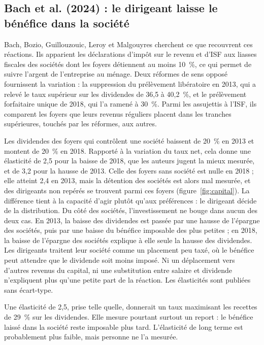 \documentclass[11pt,a4paper]{article}
\begin{document}
\subsection{Bach et al. (2024) : le dirigeant laisse le bénéfice dans la société}

Bach, Bozio, Guillouzouic, Leroy et Malgouyres cherchent ce que recouvrent ces réactions. Ils
apparient les déclarations d'impôt sur le revenu et d'ISF aux liasses fiscales des sociétés dont les
foyers détiennent au moins 10~\%, ce qui permet de suivre l'argent de l'entreprise au ménage. Deux
réformes de sens opposé fournissent la variation : la suppression du prélèvement libératoire en 2013,
qui a relevé le taux supérieur sur les dividendes de 36,5 à 40,2~\%, et le prélèvement forfaitaire
unique de 2018, qui l'a ramené à 30~\%. Parmi les assujettis à l'ISF, ils comparent les foyers que
leurs revenus réguliers placent dans les tranches supérieures, touchés par les réformes, aux autres.

Les dividendes des foyers qui contrôlent une société baissent de 20~\% en 2013 et montent de 20~\% en
2018. Rapporté à la variation du taux net, cela donne une élasticité de 2,5 pour la baisse de 2018,
que les auteurs jugent la mieux mesurée, et de 3,2 pour la hausse de 2013. Celle des foyers sans
société est nulle en 2018 ; elle atteint 2,4 en 2013, mais la détention des sociétés est alors mal
mesurée, et des dirigeants non repérés se trouvent parmi ces foyers (figure~\ref{fig:capital}). La
différence tient à la capacité d'agir plutôt qu'aux préférences : le
dirigeant décide de la distribution. Du côté des sociétés, l'investissement ne bouge dans aucun des
deux cas. En 2013, la baisse des dividendes est passée par une hausse de l'épargne des sociétés,
puis par une baisse du bénéfice imposable des plus petites ; en 2018, la baisse de l'épargne des
sociétés explique à elle seule la hausse des dividendes. Les dirigeants traitent leur société comme
un placement peu taxé, où le bénéfice peut attendre que le dividende soit moins imposé. Ni un
déplacement vers d'autres revenus du capital, ni une substitution entre salaire et dividende
n'expliquent plus qu'une petite part de la réaction. Les élasticités sont publiées sans
écart-type.

Une élasticité de 2,5, prise telle quelle, donnerait un taux maximisant les recettes de 29~\% sur les
dividendes. Elle mesure pourtant surtout un report : le bénéfice laissé dans la société reste
imposable plus tard. L'élasticité de long terme est probablement plus faible, mais personne ne l'a
mesurée.
\end{document}
